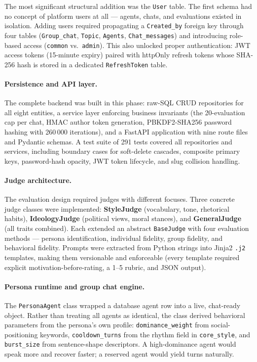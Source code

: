\documentclass[12pt,a4paper]{article}
\begin{document}
The most significant structural addition was the \texttt{User} table. The first schema had no
concept of platform users at all --- agents, chats, and evaluations existed in isolation. Adding
users required propagating a \texttt{Created\_by} foreign key through four tables
(\texttt{Group\_chat}, \texttt{Topic}, \texttt{Agents}, \texttt{Chat\_messages}) and introducing
role-based access (\texttt{common} vs.\ \texttt{admin}). This also unlocked proper authentication:
JWT access tokens (15-minute expiry) paired with httpOnly refresh tokens whose SHA-256 hash is
stored in a dedicated \texttt{RefreshToken} table.

\paragraph{Persistence and API layer.}
The complete backend was built in this phase: raw-SQL CRUD repositories for all eight entities,
a service layer enforcing business invariants (the 20-evaluation cap per chat, HMAC author token
generation, PBKDF2-SHA256 password hashing with 260\,000 iterations), and a FastAPI application
with nine route files and Pydantic schemas. A test suite of 291 tests covered all repositories
and services, including boundary cases for soft-delete cascades, composite primary keys,
password-hash opacity, JWT token lifecycle, and slug collision handling.

\paragraph{Judge architecture.}
The evaluation design required judges with different focuses. Three concrete judge classes were
implemented: \textbf{StyleJudge} (vocabulary, tone, rhetorical habits),
\textbf{IdeologyJudge} (political views, moral stances), and \textbf{GeneralJudge} (all traits
combined). Each extended an abstract \texttt{BaseJudge} with four evaluation methods ---
persona identification, individual fidelity, group fidelity, and behavioral fidelity. Prompts
were extracted from Python strings into Jinja2 \texttt{.j2} templates, making them versionable
and enforceable (every template required explicit motivation-before-rating, a 1--5 rubric, and
JSON output).

\paragraph{Persona runtime and group chat engine.}
The \texttt{PersonaAgent} class wrapped a database agent row into a live, chat-ready object.
Rather than treating all agents as identical, the class derived behavioral parameters from the
persona's own profile: \texttt{dominance\_weight} from social-positioning keywords,
\texttt{cooldown\_turns} from the rhythm field in \texttt{core\_style}, and
\texttt{burst\_size} from sentence-shape descriptors. A high-dominance agent would speak more
and recover faster; a reserved agent would yield turns naturally.
\end{document}
